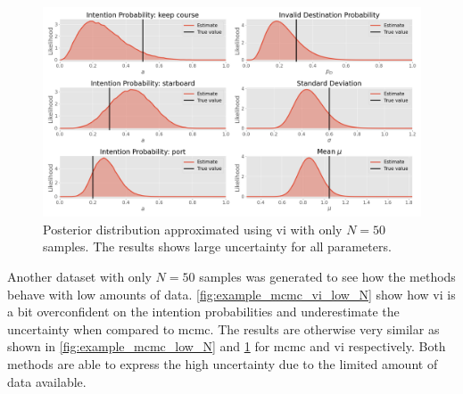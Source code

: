 \begin{figure}[h]
    \centering
    \includegraphics[width=\textwidth]{figures/example_vi_low_N.png}
    \caption{Posterior distribution approximated using \acrshort{vi} with only $N=50$ samples. The results shows large uncertainty for all parameters.}
    \label{fig:example_vi_low_N}
\end{figure}



Another dataset with only $N=50$ samples was generated to see how the methods behave with low amounts of data. \cref{fig:example_mcmc_vi_low_N} show how \acrshort{vi} is a bit overconfident on the intention probabilities and underestimate the uncertainty when compared to \acrshort{mcmc}. The results are otherwise very similar as shown in \cref{fig:example_mcmc_low_N} and \cref{fig:example_vi_low_N} for \acrshort{mcmc} and \acrshort{vi} respectively. Both methods are able to express the high uncertainty due to the limited amount of data available. 

